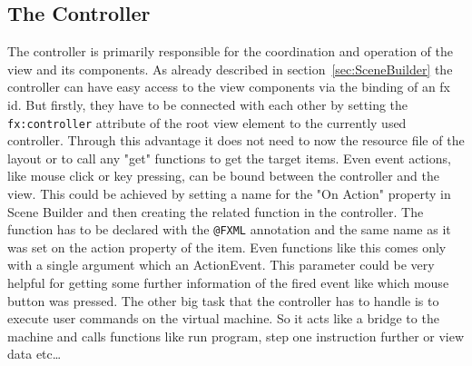 \subsection{The Controller}
The controller is primarily responsible for the coordination and operation of the view and its components. As already described in section~\ref{sec:SceneBuilder} the controller can have easy access to the view components via the binding of an fx id. But firstly, they have to be connected with each other by setting the \lstinline$fx:controller$ attribute of the root view element to the currently used controller. Through this advantage it does not need to now the resource file of the layout or to call any "get" functions to get the target items. Even event actions, like mouse click or key pressing, can be bound between the controller and the view. This could be achieved by setting a name for the "On Action" property in Scene Builder and then creating the related function in the controller. The function has to be declared with the \lstinline$@FXML$ annotation and the same name as it was set on the action property of the item. Even functions like this comes only with a single argument which an ActionEvent. This parameter could be very helpful for getting some further information of the fired event like which mouse button was pressed.
The other big task that the controller has to handle is to execute user commands on the virtual machine. So it acts like a bridge to the machine and calls functions like run program, step one instruction further or view data etc\ldots 

